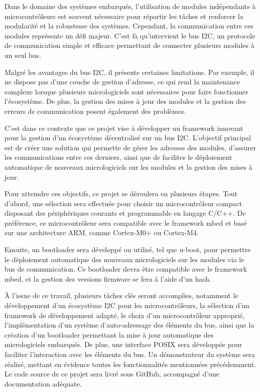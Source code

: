 Dans le domaine des systèmes embarqués, l'utilisation de modules indépendants à microcontrôleurs est souvent nécessaire pour répartir les tâches et renforcer la modularité et la robustesse des systèmes.
Cependant, la communication entre ces modules représente un défi majeur.
C'est là qu'intervient le bus I2C, un protocole de communication simple et efficace permettant de connecter plusieurs modules à un seul bus.

Malgré les avantages du bus I2C, il présente certaines limitations.
Par exemple, il ne dispose pas d'une couche de gestion d'adresse, ce qui rend la maintenance complexe lorsque plusieurs micrologiciels sont nécessaires pour faire fonctionner l'écosystème.
De plus, la gestion des mises à jour des modules et la gestion des erreurs de communication posent également des problèmes.

C'est dans ce contexte que ce projet vise à développer un framework innovant pour la gestion d'un écosystème décentralisé sur un bus I2C.
L'objectif principal est de créer une solution qui permette de gérer les adresses des modules, d'assurer les communications entre ces derniers, ainsi que de faciliter le déploiement automatique de nouveaux micrologiciels sur les modules et la gestion des mises à jour.

Pour atteindre ces objectifs, ce projet se déroulera en plusieurs étapes.
Tout d'abord, une sélection sera effectuée pour choisir un microcontrôleur compact disposant des périphériques courants et programmable en langage C/C++.
De préférence, ce microcontrôleur sera compatible avec le framework mbed et basé sur une architecture ARM, comme Cortex-M0+ ou Cortex-M4.

Ensuite, un bootloader sera développé ou utilisé, tel que u-boot, pour permettre le déploiement automatique des nouveaux micrologiciels sur les modules via le bus de communication.
Ce bootloader devra être compatible avec le framework mbed, et la gestion des versions firmware se fera à l'aide d'un hash.

À l'issue de ce travail, plusieurs tâches clés seront accomplies, notamment le développement d'un écosystème I2C pour les microcontrôleurs, la sélection d'un framework de développement adapté, le choix d'un microcontrôleur approprié, l'implémentation d'un système d'auto-adressage des éléments du bus, ainsi que la création d'un bootloader permettant la mise à jour automatique des micrologiciels embarqués.
De plus, une interface POSIX sera développée pour faciliter l'interaction avec les éléments du bus.
Un démonstrateur du système sera réalisé, mettant en évidence toutes les fonctionnalités mentionnées précédemment.
Le code source de ce projet sera livré sous GitHub, accompagné d'une documentation adéquate.

